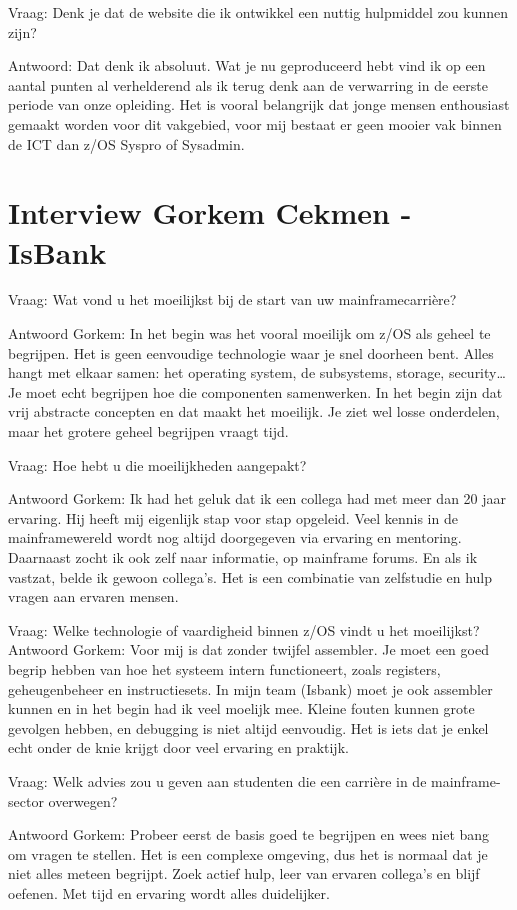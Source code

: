 Vraag: Denk je dat de website die ik ontwikkel een nuttig hulpmiddel zou
kunnen zijn?

Antwoord: Dat denk ik absoluut. Wat je nu geproduceerd hebt vind ik op een aantal
punten al verhelderend als ik terug denk aan de verwarring in de eerste
periode van onze opleiding.
Het is vooral belangrijk dat jonge mensen enthousiast gemaakt worden
voor dit vakgebied, voor mij bestaat er geen mooier vak binnen de ICT
dan z/OS Syspro of Sysadmin.


\section{Interview Gorkem Cekmen - IsBank}

Vraag: Wat vond u het moeilijkst bij de start van uw mainframecarrière?

Antwoord Gorkem: In het begin was het vooral moeilijk om z/OS als geheel te begrijpen. Het is geen eenvoudige technologie waar je snel doorheen bent. Alles hangt met elkaar samen: het operating system, de subsystems, storage, security… Je moet echt begrijpen hoe die componenten samenwerken. In het begin zijn dat vrij abstracte concepten en dat maakt het moeilijk. Je ziet wel losse onderdelen, maar het grotere geheel begrijpen vraagt tijd.

Vraag: Hoe hebt u die moeilijkheden aangepakt?

Antwoord Gorkem: Ik had het geluk dat ik een collega had met meer dan 20 jaar ervaring. Hij heeft mij eigenlijk stap voor stap opgeleid. Veel kennis in de mainframewereld wordt nog altijd doorgegeven via ervaring en mentoring. Daarnaast zocht ik ook zelf naar informatie,  op mainframe forums. En als ik vastzat, belde ik gewoon collega’s. Het is een combinatie van zelfstudie en hulp vragen aan ervaren mensen.

Vraag: Welke technologie of vaardigheid binnen z/OS vindt u het moeilijkst?
Antwoord Gorkem: Voor mij is dat zonder twijfel assembler. Je moet een goed begrip hebben van hoe het systeem intern functioneert, zoals registers, geheugenbeheer en instructiesets. In mijn team (Isbank) moet je ook assembler kunnen en in het begin had ik veel moelijk mee. Kleine fouten kunnen grote gevolgen hebben, en debugging is niet altijd eenvoudig. Het is iets dat je enkel echt onder de knie krijgt door veel ervaring en praktijk.

Vraag: Welk advies zou u geven aan studenten die een carrière in de mainframe-sector overwegen?

Antwoord Gorkem: Probeer eerst de basis goed te begrijpen en wees niet bang om vragen te stellen. Het is een complexe omgeving, dus het is normaal dat je niet alles meteen begrijpt. Zoek actief hulp, leer van ervaren collega’s en blijf oefenen. Met tijd en ervaring wordt alles duidelijker.


